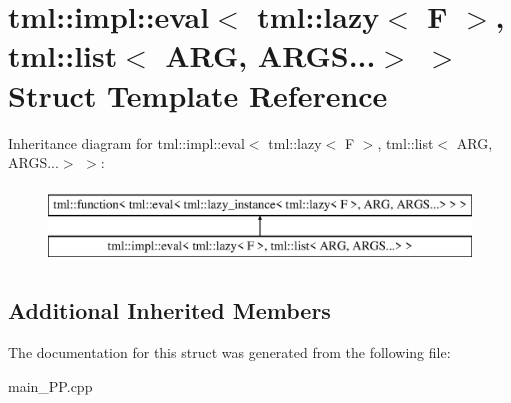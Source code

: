 \hypertarget{structtml_1_1impl_1_1eval_3_01tml_1_1lazy_3_01F_01_4_00_01tml_1_1list_3_01ARG_00_01ARGS_8_8_8_4_01_4}{\section{tml\+:\+:impl\+:\+:eval$<$ tml\+:\+:lazy$<$ F $>$, tml\+:\+:list$<$ A\+R\+G, A\+R\+G\+S...$>$ $>$ Struct Template Reference}
\label{structtml_1_1impl_1_1eval_3_01tml_1_1lazy_3_01F_01_4_00_01tml_1_1list_3_01ARG_00_01ARGS_8_8_8_4_01_4}
}
Inheritance diagram for tml\+:\+:impl\+:\+:eval$<$ tml\+:\+:lazy$<$ F $>$, tml\+:\+:list$<$ A\+R\+G, A\+R\+G\+S...$>$ $>$\+:\begin{figure}[H]
\begin{center}
\leavevmode
\includegraphics[height=2.000000cm]{structtml_1_1impl_1_1eval_3_01tml_1_1lazy_3_01F_01_4_00_01tml_1_1list_3_01ARG_00_01ARGS_8_8_8_4_01_4}
\end{center}
\end{figure}
\subsection*{Additional Inherited Members}


The documentation for this struct was generated from the following file\+:\begin{DoxyCompactItemize}
\item 
main\+\_\+\+P\+P.\+cpp\end{DoxyCompactItemize}
